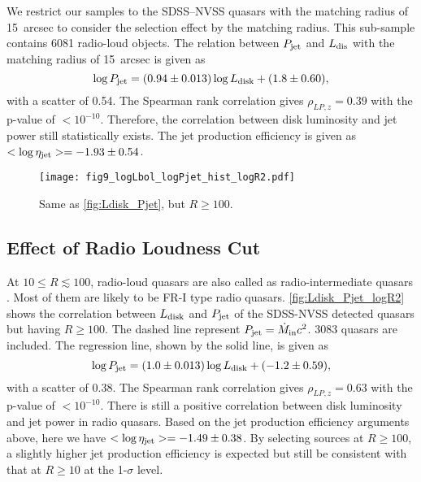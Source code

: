 \documentclass[preprint2,twocolappendix]{aastex6}
\begin{document}
We restrict our samples to the SDSS--NVSS quasars with the matching radius of 15~arcsec to consider the selection effect by the matching radius. This sub-sample contains 6081 radio-loud objects. The relation between $P_{\rm jet}$ and $L_{\rm dis}$ with the matching radius of 15~arcsec is given as
\begin{equation}
\log P_{\rm jet} = (0.94\pm0.013) \log L_{\rm disk} + (1.8 \pm 0.60),
\end{equation}
with a scatter of 0.54. The Spearman rank correlation gives $\rho_{LP,z}=0.39$ with the p-value of $<10^{-10}$.  Therefore, the correlation between disk luminosity and jet power still statistically exists. The jet production efficiency is given as $<\log \eta_{\rm jet}>=-1.93 \pm0.54$.


\begin{figure}[t]
 \begin{center}
  \texttt{[image: fig9\_logLbol\_logPjet\_hist\_logR2.pdf]} 
 \end{center}
\caption{Same as \autoref{fig:Ldisk_Pjet}, but $R\geq100$.}\label{fig:Ldisk_Pjet_logR2}
\end{figure}

\subsection{Effect of Radio Loudness Cut}
At $10\leq R\lesssim100$, radio-loud quasars are also called as radio-intermediate quasars \citep{fal96}. Most of them are likely to be FR-I type radio quasars. \autoref{fig:Ldisk_Pjet_logR2} shows the correlation between $L_{\rm disk}$ and $P_{\rm jet}$ of the SDSS-NVSS detected quasars but  having $R\geq100$. The dashed line represent $P_{\rm jet} =\dot{M}_{\rm in} c^2$. 3083 quasars are included. The regression line, shown by the solid line, is given as
\begin{equation}
\log P_{\rm jet} = (1.0 \pm 0.013) \log L_{\rm disk} + (-1.2 \pm 0.59),
\end{equation}
with a scatter of 0.38. The Spearman rank correlation gives $\rho_{LP,z}=0.63$ with the p-value of $<10^{-10}$. There is still a positive correlation between disk luminosity and jet power in radio quasars. Based on the jet production efficiency arguments above, here we have $<\log \eta_{\rm jet}>=-1.49\pm0.38$. By selecting sources at $R\geq100$, a slightly higher jet production efficiency is expected but still be consistent with that at $R\geq10$ at the 1-$\sigma$ level.
\end{document}
